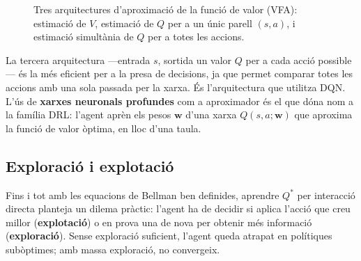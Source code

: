 \begin{figure}[H]
  \centering
  \caption{Tres arquitectures d'aproximació de la funció de valor (VFA):
    estimació de $V$, estimació de $Q$ per a un únic parell $(s,a)$, i
    estimació simultània de $Q$ per a totes les accions.}
  \label{fig:vfa-tipus}
\end{figure}

La tercera arquitectura —entrada $s$, sortida un valor $Q$ per a cada
acció possible— és la més eficient per a la presa de decisions, ja que
permet comparar totes les accions amb una sola passada per la xarxa. És
l'arquitectura que utilitza \ac{DQN}. L'ús de \textbf{xarxes neuronals
profundes} com a aproximador és el que dóna nom a la família
\ac{DRL}: l'agent aprèn els pesos $\mathbf{w}$ d'una xarxa
$Q(s,a;\mathbf{w})$ que aproxima la funció de valor òptima, en lloc
d'una taula.

\FloatBarrier
\subsection*{Exploració i explotació}

Fins i tot amb les equacions de Bellman ben definides, aprendre $Q^*$ per
interacció directa planteja un dilema pràctic: l'agent ha de decidir si aplica
l'acció que creu millor (\textbf{explotació}) o en prova una de nova per
obtenir més informació (\textbf{exploració}). Sense exploració suficient,
l'agent queda atrapat en polítiques subòptimes; amb massa exploració, no
convergeix.

